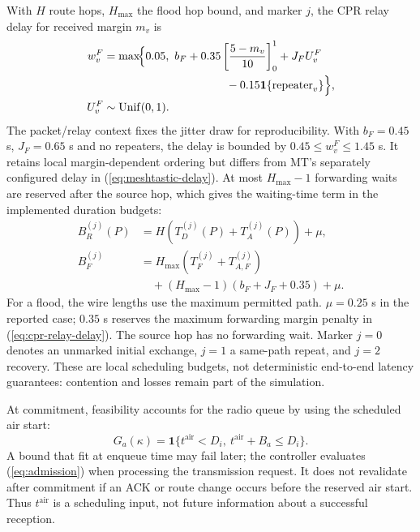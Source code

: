 \documentclass[conference,letterpaper,10pt]{IEEEtran}
\begin{document}
With $H$ route hops, $H_{\max}$ the flood hop bound, and marker $j$, the
CPR relay delay for received margin $m_v$ is
\begin{equation}
\begin{aligned}
w_v^{F}&=\max\!\Bigl\{0.05,\ b_F+
  0.35\left[\frac{5-m_v}{10}\right]_0^1+J_F U_v^F\\
 &\hspace{38mm}-0.15\mathbf 1\{\mathrm{repeater}_v\}\Bigr\},\\
U_v^F&\sim\mathrm{Unif}(0,1).
\end{aligned}
\label{eq:cpr-relay-delay}
\end{equation}
The packet/relay context fixes the jitter draw for reproducibility.
With $b_F=0.45$ s, $J_F=0.65$ s and no repeaters, the delay is bounded by
$0.45\leq w_v^F\leq1.45$ s. It retains local margin-dependent ordering
but differs from MT's separately configured delay in
(\ref{eq:meshtastic-delay}). At most $H_{\max}-1$ forwarding waits are
reserved after the source hop, which gives the waiting-time term in the
implemented duration budgets:
\begin{equation}
\begin{aligned}
B_R^{(j)}(P)&=H\left(T_D^{(j)}(P)+T_A^{(j)}(P)\right)+\mu,\\
B_F^{(j)}&=H_{\max}\left(T_F^{(j)}+T_{A,F}^{(j)}\right)\\
 &\quad +(H_{\max}-1)(b_F+J_F+0.35)+\mu.
\end{aligned}
\label{eq:cpr-bounds}
\end{equation}
For a flood, the wire lengths use the maximum permitted path.
$\mu=0.25$ s in the reported case; $0.35$ s reserves the maximum
forwarding margin penalty in (\ref{eq:cpr-relay-delay}).
The source hop has no forwarding wait. Marker $j=0$ denotes an unmarked
initial exchange, $j=1$ a same-path repeat, and $j=2$ recovery.
These are local scheduling budgets, not deterministic end-to-end latency
guarantees: contention and losses remain part of the simulation.

At commitment, feasibility accounts for the radio queue by using
the scheduled air start:
\begin{equation}
G_a(\kappa)=\mathbf 1\{t^{\mathrm{air}}<D_i,\ t^{\mathrm{air}}+B_a\leq D_i\}.
\label{eq:admission}
\end{equation}
A bound that fit at enqueue time may fail later; the controller evaluates
(\ref{eq:admission}) when processing the transmission request. It does not
revalidate after commitment if an ACK or route change occurs before the
reserved air start. Thus $t^{\mathrm{air}}$ is a scheduling input, not
future information about a successful reception.
\end{document}
